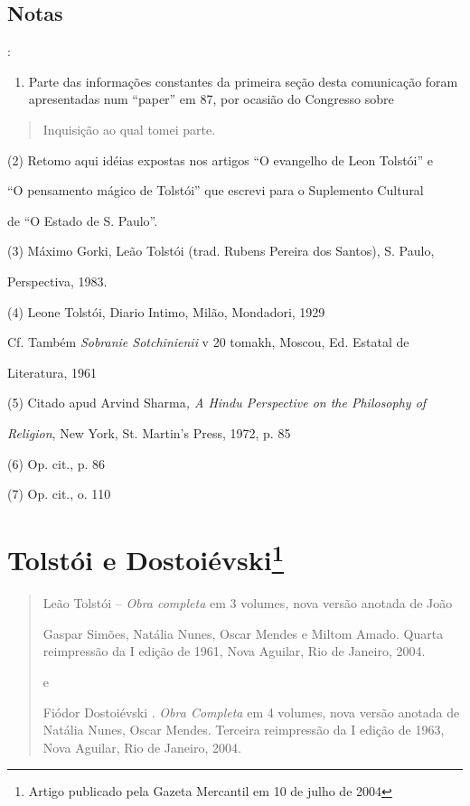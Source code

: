 \section{{Notas}}:

\begin{enumerate}
\def\labelenumi{(\arabic{enumi})}
\item
  Parte das informações constantes da primeira seção desta comunicação
  foram apresentadas num ``paper'' em 87, por ocasião do Congresso sobre
\end{enumerate}

\begin{quote}
Inquisição ao qual tomei parte.
\end{quote}

(2) Retomo aqui idéias expostas nos artigos ``O evangelho de Leon
Tolstói'' e

``O pensamento mágico de Tolstói'' que escrevi para o Suplemento
Cultural

de ``O Estado de S. Paulo''.

(3) Máximo Gorki, Leão Tolstói (trad. Rubens Pereira dos Santos), S.
Paulo,

Perspectiva, 1983.

(4) Leone Tolstói, Diario Intimo, Milão, Mondadori, 1929

Cf. Também \emph{Sobranie Sotchinienii} v 20 tomakh, Moscou, Ed. Estatal
de

Literatura, 1961

(5) Citado apud Arvind Sharma\emph{, A Hindu Perspective on the
Philosophy of }

\emph{Religion}, New York, St. Martin's Press, 1972, p. 85

(6) Op. cit., p. 86

(7) Op. cit., o. 110

\chapter{Tolstói e Dostoiévski\footnote{Artigo publicado pela Gazeta
  Mercantil em 10 de julho de 2004}}

\begin{quote}
Leão Tolstói -- \emph{Obra completa} em 3 volumes\emph{,} nova versão
anotada de João

Gaspar Simões, Natália Nunes, Oscar Mendes e Miltom Amado. Quarta
reimpressão da I edição de 1961, Nova Aguilar, Rio de Janeiro, 2004.

e

Fiódor Dostoiévski . \emph{Obra Completa} em 4 volumes, nova versão
anotada de Natália Nunes, Oscar Mendes. Terceira reimpressão da I edição
de 1963, Nova Aguilar, Rio de Janeiro, 2004.
\end{quote}

